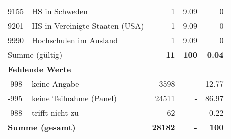 \begin{longtable}{lXrrr}
     9155 &
     \multicolumn{1}{X}{ HS in Schweden   } &


       \num{1} &
       \num[round-mode=places,round-precision=2]{9.09} &
         \num[round-mode=places,round-precision=2]{0} \\

     9201 &
     \multicolumn{1}{X}{ HS in Vereinigte Staaten (USA)   } &


       \num{1} &
       \num[round-mode=places,round-precision=2]{9.09} &
         \num[round-mode=places,round-precision=2]{0} \\

     9990 &
     \multicolumn{1}{X}{ Hochschulen im Ausland   } &


       \num{1} &
       \num[round-mode=places,round-precision=2]{9.09} &
         \num[round-mode=places,round-precision=2]{0} \\
     \midrule
     \multicolumn{2}{l}{Summe (gültig)} &
       \textbf{\num{11}} &
     \textbf{\num{100}} &
       \textbf{\num[round-mode=places,round-precision=2]{0.04}} \\
     \multicolumn{5}{l}{\textbf{Fehlende Werte}}\\
       -998 &
       keine Angabe &
         \num{3598} &
        - &
         \num[round-mode=places,round-precision=2]{12.77} \\
       -995 &
       keine Teilnahme (Panel) &
         \num{24511} &
        - &
         \num[round-mode=places,round-precision=2]{86.97} \\
       -988 &
       trifft nicht zu &
         \num{62} &
        - &
         \num[round-mode=places,round-precision=2]{0.22} \\
     \midrule
     \multicolumn{2}{l}{\textbf{Summe (gesamt)}} &
          \textbf{\num{28182}} &
        \textbf{-} &
        \textbf{\num{100}} \\
     \bottomrule
     \end{longtable}
     
